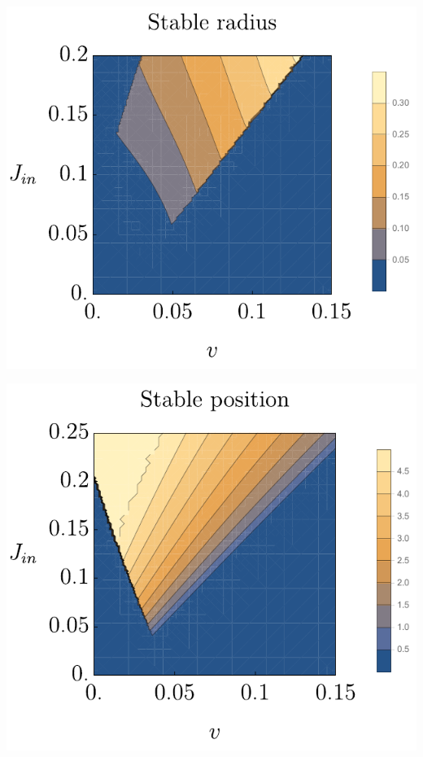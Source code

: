 \documentclass{Dissertate}
\let\origfigure\figure
\let\endorigfigure\endfigure
\renewenvironment{figure}[1][2] {
    \expandafter\origfigure\expandafter[H]
} {
    \endorigfigure
}
\begin{document}
\begin{figure}
\hypertarget{fig:rstabledecay}{%
\centering
\includegraphics{source/figures/pdf/Rstable.pdf}
\caption{Steady state radius as a function of \(v\) and \(J_{in}\) made
using \(k=0.3, a=0.1, D=1 ,c_0^-=0.1,c_0^+=0.9, L=5\). Blue areas
correspond to no droplet.}\label{fig:rstabledecay}
}
\end{figure}

\begin{figure}
\hypertarget{fig:xstabledecay}{%
\centering
\includegraphics{source/figures/pdf/Xstable.pdf}
\caption{Steady state position as a function of \(v\) and \(J_{in}\)
made using \(k=0.3, a=0.1, D=1 ,c_0^-=0.1,c_0^+=0.9, L=5\). Blue areas
correspond to no droplet.}\label{fig:xstabledecay}
}
\end{figure}
\end{document}
